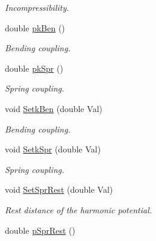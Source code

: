 \begin{DoxyCompactItemize}
\begin{DoxyCompactList}\small\item\em \-Incompressibility. \end{DoxyCompactList}\item 
\hypertarget{classVarData_a395cfa5f68437606051e29df1759e371}{double \hyperlink{classVarData_a395cfa5f68437606051e29df1759e371}{pk\-Ben} ()}\label{classVarData_a395cfa5f68437606051e29df1759e371}

\begin{DoxyCompactList}\small\item\em \-Bending coupling. \end{DoxyCompactList}\item 
\hypertarget{classVarData_a16f3b01ba84886cbaf53fa1238c434f3}{double \hyperlink{classVarData_a16f3b01ba84886cbaf53fa1238c434f3}{pk\-Spr} ()}\label{classVarData_a16f3b01ba84886cbaf53fa1238c434f3}

\begin{DoxyCompactList}\small\item\em \-Spring coupling. \end{DoxyCompactList}\item 
\hypertarget{classVarData_a8b0df96451468c9ee33e780d2415d41b}{void \hyperlink{classVarData_a8b0df96451468c9ee33e780d2415d41b}{\-Setk\-Ben} (double \-Val)}\label{classVarData_a8b0df96451468c9ee33e780d2415d41b}

\begin{DoxyCompactList}\small\item\em \-Bending coupling. \end{DoxyCompactList}\item 
\hypertarget{classVarData_aa06753ad7a63b8c66f00d123a41abab6}{void \hyperlink{classVarData_aa06753ad7a63b8c66f00d123a41abab6}{\-Setk\-Spr} (double \-Val)}\label{classVarData_aa06753ad7a63b8c66f00d123a41abab6}

\begin{DoxyCompactList}\small\item\em \-Spring coupling. \end{DoxyCompactList}\item 
\hypertarget{classVarData_af7a6e7b2d5b68ac853cf2c9438d5ebda}{void \hyperlink{classVarData_af7a6e7b2d5b68ac853cf2c9438d5ebda}{\-Set\-Spr\-Rest} (double \-Val)}\label{classVarData_af7a6e7b2d5b68ac853cf2c9438d5ebda}

\begin{DoxyCompactList}\small\item\em \-Rest distance of the harmonic potential. \end{DoxyCompactList}\item 
\hypertarget{classVarData_ad180facca71ad48ae3ce77052bf22957}{double \hyperlink{classVarData_ad180facca71ad48ae3ce77052bf22957}{p\-Spr\-Rest} ()}\label{classVarData_ad180facca71ad48ae3ce77052bf22957}


\end{DoxyCompactItemize}
